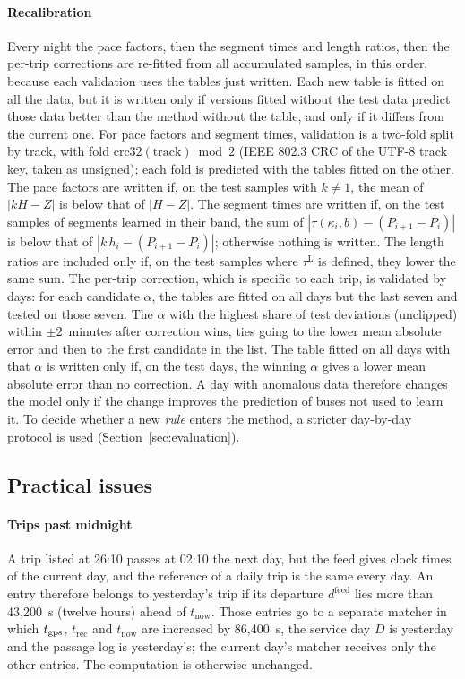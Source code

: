 \paragraph{Recalibration} Every night the pace factors, then the segment times and length ratios, then the per-trip
corrections are re-fitted from all accumulated samples, in this order, because each validation uses the tables just
written. Each new table is fitted on all the data, but it is written only if versions fitted without the test data
predict those data better than the method without the table, and only if it differs from the current one. For pace
factors and segment times, validation is a two-fold split by track, with fold $\mathrm{crc32}(\text{track})\bmod2$
(IEEE 802.3 CRC of the UTF-8 track key, taken as unsigned); each fold is predicted with the tables fitted on the
other. The pace factors are written if, on the test samples with $k\ne1$, the mean of $|kH-Z|$ is below that of
$|H-Z|$. The segment times are written if, on the test samples of segments learned in their band, the sum of
$|\tau(\kappa_i,b)-(P_{i+1}-P_i)|$ is below that of $|k\,h_i-(P_{i+1}-P_i)|$; otherwise nothing is written. The length
ratios are included only if, on the test samples where $\tau^{\mathrm L}$ is defined, they lower the same sum. The
per-trip correction, which is specific to each trip, is validated by days: for each candidate $\alpha$, the tables are
fitted on all days but the last seven and tested on those seven. The $\alpha$ with the highest share of test
deviations (unclipped) within $\pm2$~minutes after correction wins, ties going to the lower mean absolute error and
then to the first candidate in the list. The table fitted on all days with that $\alpha$ is written only if, on the
test days, the winning $\alpha$ gives a lower mean absolute error than no correction. A day with anomalous data
therefore changes the model only if the change improves the prediction of buses not used to learn it. To decide
whether a new \emph{rule} enters the method, a stricter day-by-day protocol is used (Section~\ref{sec:evaluation}).

\subsection{Practical issues}
\label{sec:practical}

\paragraph{Trips past midnight} A trip listed at 26:10 passes at 02:10 the next day, but the feed gives clock times of
the current day, and the reference of a daily trip is the same every day. An entry therefore belongs to yesterday's
trip if its departure $d^{\mathrm{feed}}$ lies more than 43,200~s (twelve hours) ahead of $t_{\mathrm{now}}$. Those
entries go to a separate matcher in which $t_{\mathrm{gps}}$, $t_{\mathrm{rec}}$ and $t_{\mathrm{now}}$ are increased by
86,400~s, the service day $D$ is yesterday and the passage log is yesterday's; the current day's matcher receives only
the other entries. The computation is otherwise unchanged.

